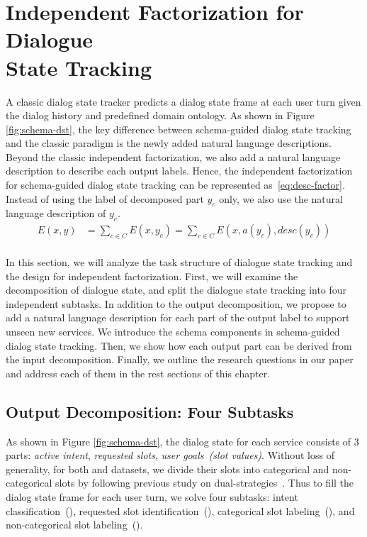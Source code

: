 
\section[Independent Factorization for Dialogue State Tracking]{Independent Factorization for Dialogue \\State Tracking}
\label{sec:sgd:ind-factorization}
A classic dialog state tracker predicts a dialog state frame at each
user turn given the dialog history and predefined domain ontology. As
shown in Figure \ref{fig:schema-dst}, the key difference between
schema-guided dialog state tracking and the classic paradigm is the
newly added natural language descriptions. Beyond the classic
independent factorization, we also add a natural language description
to describe each output labels. Hence, the independent factorization
for schema-guided dialog state tracking can be represented
as~\autoref{eq:desc-factor}. Instead of using the label of decomposed
part $y_{c}$ only, we also use the natural language description of
$y_{c}$.
\begin{equation}
    \label{eq:desc-factor}
    \begin{split}
    E(x, y) & =\sum_{c \in C} E(x, y_{c}) = \sum_{c \in C}E(x, a(y_{c}), desc(y_{c}))  \\
    \end{split}
\end{equation}

In this section, we will
analyze the task structure of dialogue state tracking and the design
for independent factorization. First, we will examine the
decomposition of dialogue state, and split the dialogue state tracking
into four independent subtasks. In addition to the output
decomposition, we propose to add a natural language description for
each part of the output label to support unseen new services. We
introduce the schema components in schema-guided dialog state
tracking. Then, we show how each output part can be derived from the
input decomposition. Finally, we outline the research questions in
our paper and address each of them in the rest sections of this
chapter.

\subsection{Output Decomposition: Four Subtasks}
\label{sec:sgd:decompose-y}
As shown in Figure \ref{fig:schema-dst}, the dialog state for each
service consists of 3 parts: {\it active intent}, {\it requested
  slots}, {\it user goals~(slot values)}. Without loss of generality,
for both \sgdst and \multiwoz datasets, we divide their slots into
categorical and non-categorical slots by following previous study on
dual-strategies~\cite{zhang2019find}. Thus to fill the dialog state
frame for each user turn, we solve four  subtasks:
intent classification~(\IC), requested slot identification~(\RSI),
categorical slot labeling~(\CSL), and non-categorical slot
labeling~(\NSL).

